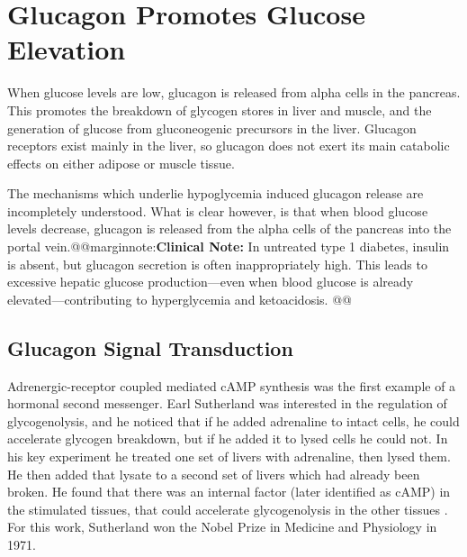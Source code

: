 \documentclass{tufte-handout}
\makeatletter
\def\marginnote#1{@@marginnote:#1@@}
\makeatother
\begin{document}
\section{Glucagon Promotes Glucose Elevation}

 When glucose levels are low, glucagon is released from alpha cells in the pancreas.  This promotes the breakdown of glycogen stores in liver and muscle, and the generation of glucose from gluconeogenic precursors in the liver.  Glucagon receptors exist mainly in the liver, so glucagon does not exert its main catabolic effects on either adipose or muscle tissue. 

The mechanisms which underlie hypoglycemia induced glucagon release are incompletely understood.  What is clear however, is that when blood glucose levels decrease, glucagon is released from the alpha cells of the pancreas into the portal vein.\marginnote{\textbf{Clinical Note:} In untreated type 1 diabetes, insulin is absent, but glucagon secretion is often inappropriately high. This leads to excessive hepatic glucose production—even when blood glucose is already elevated—contributing to hyperglycemia and ketoacidosis.
}

\subsection{Glucagon Signal Transduction}

Adrenergic-receptor coupled mediated cAMP synthesis was the first example of a hormonal second messenger.  Earl Sutherland was interested in the regulation of glycogenolysis, and he noticed that if he added adrenaline to intact cells, he could accelerate glycogen breakdown, but if he added it to lysed cells he could not.  In his key experiment he treated one set of livers with adrenaline, then lysed them.  He then added that lysate to a second set of livers which had already been broken.  He found that there was an internal factor (later identified as cAMP) in the stimulated tissues, that could accelerate glycogenolysis in the other tissues \citep{Rall1956}. For this work, Sutherland won the Nobel Prize in Medicine and Physiology in 1971.
\end{document}
